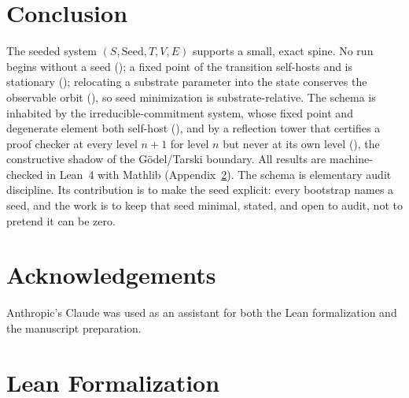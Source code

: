 \documentclass[11pt,a4paper]{article}
\newcommand{\Seed}{\mathrm{Seed}}
\begin{document}
\section{Conclusion}
\label{sec:conclusion}

The seeded system $(S, \Seed, T, V, E)$ supports a small, exact spine.
No run begins without a seed ();
a fixed point of the transition self-hosts and is stationary
();
relocating a substrate parameter into the state conserves the observable orbit
(), so seed minimization is substrate-relative.
The schema is inhabited by the irreducible-commitment system, whose fixed point
and degenerate element both self-host
(), and by a reflection tower that
certifies a proof checker at every level $n+1$ for level $n$ but never at its
own level (), the constructive shadow of the
G\"odel/Tarski boundary.
All results are machine-checked in Lean~4 with Mathlib (Appendix~\ref{app:lean}).
The schema is elementary audit discipline.
Its contribution is to make the seed explicit: every bootstrap names a seed, and
the work is to keep that seed minimal, stated, and open to audit, not to pretend
it can be zero.

\section*{Acknowledgements}

Anthropic's Claude was used as an assistant for both the Lean formalization and
the manuscript preparation.





\appendix

\section{Lean Formalization}
\label{app:lean}
\end{document}
